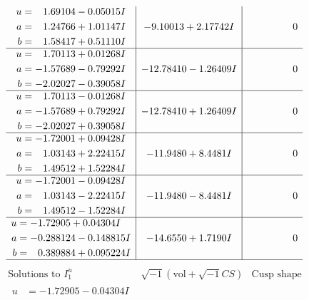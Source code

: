 \documentclass[1p]{elsarticle_modified}
\theoremstyle{definition}
\newcommand{\I}{\sqrt{-1}}
\begin{document}
$$\begin{array}{c|c|c}
\begin{aligned}
u &= \phantom{-}1.69104 - 0.05015 I \\
a &= \phantom{-}1.24766 + 1.01147 I \\
b &= \phantom{-}1.58417 + 0.51110 I\end{aligned}
 & -9.10013 + 2.17742 I & \phantom{-0.000000 } 0 \\ \hline\begin{aligned}
u &= \phantom{-}1.70113 + 0.01268 I \\
a &= -1.57689 - 0.79292 I \\
b &= -2.02027 - 0.39058 I\end{aligned}
 & -12.78410 - 1.26409 I & \phantom{-0.000000 } 0 \\ \hline\begin{aligned}
u &= \phantom{-}1.70113 - 0.01268 I \\
a &= -1.57689 + 0.79292 I \\
b &= -2.02027 + 0.39058 I\end{aligned}
 & -12.78410 + 1.26409 I & \phantom{-0.000000 } 0 \\ \hline\begin{aligned}
u &= -1.72001 + 0.09428 I \\
a &= \phantom{-}1.03143 + 2.22415 I \\
b &= \phantom{-}1.49512 + 1.52284 I\end{aligned}
 & -11.9480 + 8.4481 I & \phantom{-0.000000 } 0 \\ \hline\begin{aligned}
u &= -1.72001 - 0.09428 I \\
a &= \phantom{-}1.03143 - 2.22415 I \\
b &= \phantom{-}1.49512 - 1.52284 I\end{aligned}
 & -11.9480 - 8.4481 I & \phantom{-0.000000 } 0 \\ \hline\begin{aligned}
u &= -1.72905 + 0.04304 I \\
a &= -0.288124 - 0.148815 I \\
b &= \phantom{-}0.389884 + 0.095224 I\end{aligned}
 & -14.6550 + 1.7190 I & \phantom{-0.000000 } 0\\
 \hline 
 \end{array}$$\newpage$$\begin{array}{c|c|c}  
\text{Solutions to }I^u_{1}& \I (\text{vol} + \sqrt{-1}CS) & \text{Cusp shape}\\
 \hline 
\begin{aligned}
u &= -1.72905 - 0.04304 I \\

\end{aligned}
\end{array}$$
\end{document}
